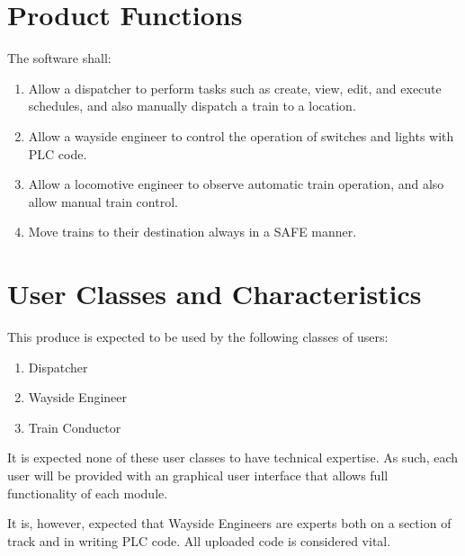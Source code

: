 \documentclass{scrreprt}
\begin{document}

\section{Product Functions}
The software shall:
    \begin{enumerate}
        \item Allow a dispatcher to perform tasks such as create, view, edit, and execute schedules, and also manually dispatch a train to a location.
        \item Allow a wayside engineer to control the operation of switches and lights with PLC code.
        \item Allow a locomotive engineer to observe automatic train operation, and also allow manual train control.
        \item Move trains to their destination always in a SAFE manner.
    \end{enumerate}

\section{User Classes and Characteristics}
This produce is expected to be used by the following classes of users:
\begin{enumerate}
    \item Dispatcher
    \item Wayside Engineer
    \item Train Conductor
\end{enumerate}

It is expected none of these user classes to have technical expertise. As such,
each user will be provided with an graphical user interface that allows full
functionality of each module.

It is, however, expected that Wayside Engineers are experts both on a section
of track and in writing PLC code. All uploaded code is considered vital.
\end{document}
